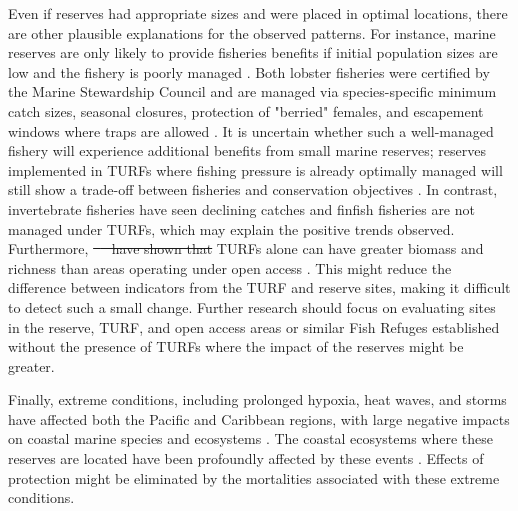 \documentclass[10pt,letterpaper]{article}
\providecommand{\DIFaddtex}[1]{{\protect\color{blue}\uwave{#1}}} %
\providecommand{\DIFdeltex}[1]{{\protect\color{red}\sout{#1}}}                      %
\providecommand{\DIFaddbegin}{} %
\providecommand{\DIFaddend}{} %
\providecommand{\DIFdelbegin}{} %
\providecommand{\DIFdelend}{} %
\providecommand{\DIFadd}[1]{\texorpdfstring{\DIFaddtex{#1}}{#1}} %
\providecommand{\DIFdel}[1]{\texorpdfstring{\DIFdeltex{#1}}{}} %
\newcommand{\DIFscaledelfig}{0.5}
\newlength{\DIFdelgraphicswidth} %
\newlength{\DIFdelgraphicsheight} %
\newcommand{\DIFaddincludegraphics}[2][]{{\color{blue}\fbox{\DIFOincludegraphics[#1]{#2}}}} %
\newcommand{\DIFdelincludegraphics}[2][]{%
\sbox{\DIFdelgraphicsbox}{\DIFOincludegraphics[#1]{#2}}%
\settoboxwidth{\DIFdelgraphicswidth}{\DIFdelgraphicsbox} %
\settoboxtotalheight{\DIFdelgraphicsheight}{\DIFdelgraphicsbox} %
\scalebox{\DIFscaledelfig}{%
\parbox[b]{\DIFdelgraphicswidth}{\usebox{\DIFdelgraphicsbox}\\[-\baselineskip] \rule{\DIFdelgraphicswidth}{0em}}\llap{\resizebox{\DIFdelgraphicswidth}{\DIFdelgraphicsheight}{%
\setlength{\unitlength}{\DIFdelgraphicswidth}%
\begin{picture}(1,1)%
\thicklines\linethickness{2pt} %
{\color[rgb]{1,0,0}\put(0,0){\framebox(1,1){}}}%
{\color[rgb]{1,0,0}\put(0,0){\line( 1,1){1}}}%
{\color[rgb]{1,0,0}\put(0,1){\line(1,-1){1}}}%
\end{picture}%
}\hspace*{3pt}}} %
} %
\DeclareRobustCommand{\DIFaddbegin}{\DIFOaddbegin \let\includegraphics\DIFaddincludegraphics} %
\DeclareRobustCommand{\DIFaddend}{\DIFOaddend \let\includegraphics\DIFOincludegraphics} %
\DeclareRobustCommand{\DIFdelbegin}{\DIFOdelbegin \let\includegraphics\DIFdelincludegraphics} %
\DeclareRobustCommand{\DIFdelend}{\DIFOaddend \let\includegraphics\DIFOincludegraphics} %
\begin{document}
Even if reserves had appropriate sizes and were placed in optimal locations, there are other plausible explanations for the observed patterns. For instance, marine reserves are only likely to provide fisheries benefits if initial population sizes are low and the fishery is poorly managed \cite{hilborn_2004,hilborn_2006}. Both lobster fisheries were certified by the Marine Stewardship Council and are managed via species-specific minimum catch sizes, seasonal closures, protection of "berried" females, and escapement windows where traps are allowed \cite{dof_website_1993}. It is uncertain whether such a well-managed fishery will experience additional benefits from small marine reserves; reserves implemented in TURFs where fishing pressure is already optimally managed will still show a trade-off between fisheries and conservation objectives \cite{lester_2017}. In contrast, invertebrate fisheries have seen declining catches and finfish fisheries are not managed under TURFs, which may explain the positive trends observed. Furthermore, \DIFdelbegin \DIFdel{\mbox{%
\cite{gelcich_2008} }\hspace{0pt}%
have shown that }\DIFdelend TURFs alone can have greater biomass and richness than areas operating under open access \DIFaddbegin \DIFadd{\mbox{%
\cite{gelcich_2008}}\hspace{0pt}%
}\DIFaddend . This might reduce the difference between indicators from the TURF and reserve sites, making it difficult to detect such a small change. Further research should focus on evaluating sites in the reserve, TURF, and open access areas or similar Fish Refuges established without the presence of TURFs where the impact of the reserves might be greater.

Finally, extreme conditions, including prolonged hypoxia, heat waves, and storms have affected both the Pacific and Caribbean regions, with large negative impacts on coastal marine species and ecosystems \cite{cavole_2016,hughes_2018,breitburg_2018}. The coastal ecosystems where these reserves are located have been profoundly affected by these events \cite{micheli_2012-EU,woodson_2018}. Effects of protection might be eliminated by the mortalities associated with these extreme conditions.
\end{document}
